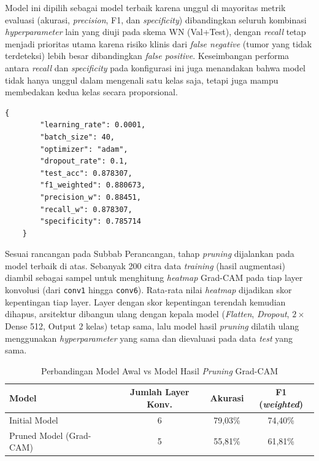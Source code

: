 Model ini dipilih sebagai model terbaik karena unggul di mayoritas metrik evaluasi (akurasi, \textit{precision}, F1, dan \textit{specificity}) dibandingkan seluruh kombinasi \textit{hyperparameter} lain yang diuji pada skema WN (Val+Test), dengan \textit{recall} tetap menjadi prioritas utama karena risiko klinis dari \textit{false negative} (tumor yang tidak terdeteksi) lebih besar dibandingkan \textit{false positive}. Keseimbangan performa antara \textit{recall} dan \textit{specificity} pada konfigurasi ini juga menandakan bahwa model tidak hanya unggul dalam mengenali satu kelas saja, tetapi juga mampu membedakan kedua kelas secara proporsional.

\begin{lstlisting}[caption={Konfigurasi Hyperparameter dan Hasil Evaluasi Model Terbaik Explainable CNN}, label={lst:hyperparam-excnn}, captionpos=t]
	{
		"learning_rate": 0.0001,
		"batch_size": 40,
		"optimizer": "adam",
		"dropout_rate": 0.1,
		"test_acc": 0.878307,
		"f1_weighted": 0.880673,
		"precision_w": 0.88451,
		"recall_w": 0.878307,
		"specificity": 0.785714
	}
\end{lstlisting}

Sesuai rancangan pada Subbab Perancangan, tahap \textit{pruning} dijalankan pada model terbaik di atas. Sebanyak 200 citra data \textit{training} (hasil augmentasi) diambil sebagai sampel untuk menghitung \textit{heatmap} Grad-CAM pada tiap layer konvolusi (dari \texttt{conv1} hingga \texttt{conv6}). Rata-rata nilai \textit{heatmap} dijadikan skor kepentingan tiap layer. Layer dengan skor kepentingan terendah kemudian dihapus, arsitektur dibangun ulang dengan kepala model (\textit{Flatten}, \textit{Dropout}, $2\times$ Dense 512, Output 2 kelas) tetap sama, lalu model hasil \textit{pruning} dilatih ulang menggunakan \textit{hyperparameter} yang sama dan dievaluasi pada data \textit{test} yang sama.

\begin{table}[htbp]
	\centering
	\caption{Perbandingan Model Awal vs Model Hasil \textit{Pruning} Grad-CAM}
	\label{tab:pruning_comparison}
	\begin{tabular}{|l|c|c|c|}
		\hline
		\textbf{Model} & \textbf{Jumlah Layer Konv.} & \textbf{Akurasi} & \textbf{F1 (\textit{weighted})} \\ \hline
		Initial Model & 6 & 79,03\% & 74,40\% \\ \hline
		Pruned Model (Grad-CAM) & 5 & 55,81\% & 61,81\% \\ \hline
	\end{tabular}
\end{table}

